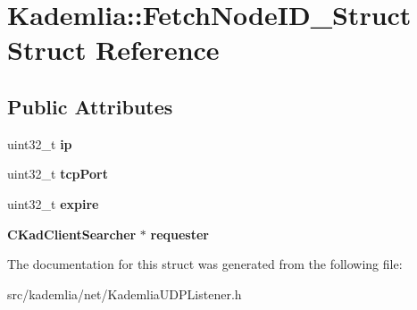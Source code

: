 \section{Kademlia::FetchNodeID\_\-Struct Struct Reference}
\label{structKademlia_1_1FetchNodeID__Struct}
\subsection*{Public Attributes}
\begin{DoxyCompactItemize}
\item 
uint32\_\-t {\bfseries ip}\label{structKademlia_1_1FetchNodeID__Struct_a636254f798d2e7e348b8b55196527442}

\item 
uint32\_\-t {\bfseries tcpPort}\label{structKademlia_1_1FetchNodeID__Struct_a3c8818b65a20612395514cce12a04944}

\item 
uint32\_\-t {\bfseries expire}\label{structKademlia_1_1FetchNodeID__Struct_a824ec56525b9941f9bf00f8406509e8e}

\item 
{\bf CKadClientSearcher} $\ast$ {\bfseries requester}\label{structKademlia_1_1FetchNodeID__Struct_a8e378310b469947ea2bd1696ce5f8821}

\end{DoxyCompactItemize}


The documentation for this struct was generated from the following file:\begin{DoxyCompactItemize}
\item 
src/kademlia/net/KademliaUDPListener.h\end{DoxyCompactItemize}

